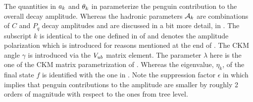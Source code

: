 \noindent The quantities in $a_k$ and $\theta_k$ in  parameterize the penguin contribution to the overall \BsJpsiPhi
decay amplitude. Whereas the hadronic parameters $\mathcal{A}_{k}$ are combinations of $C$ and $P_q$ decay amplitudes and are discussed
in a bit more detail, in .
The subscript $k$ is identical to the one defined in  of  and denotes the \BsJpsiPhi
amplitude polarization which is introduced for reasons mentioned at the end of .
The CKM angle $\gamma$ is introduced via the $V_{ub}$ matrix element. The parameter $\lambda$ here is the one of the
CKM matrix parametrization of . Whereas the eigenvalue, $\eta_k$, of the final state $f$ is identified with the one in .
Note the suppression factor $\epsilon$ in  which implies that penguin contributions to the \BsJpsiPhi amplitude are smaller
by roughly 2 orders of magnitude with respect to the ones from tree level.
